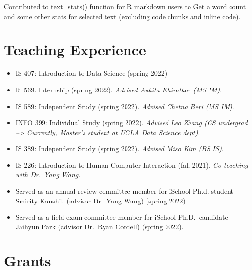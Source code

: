 \documentclass[11pt,a4paper,]{awesome-cv}
\begin{document}
\begin{cventries}
{\begin{cvitems}
\item Contributed to text\_stats() function for R markdown users to Get a word count and some other stats for selected text (excluding code chunks and inline code).
\end{cvitems}}
\end{cventries}

\hypertarget{teaching-experience}{%
\section{Teaching Experience}\label{teaching-experience}}

\begin{itemize}
\item
  IS 407: Introduction to Data Science (spring 2022).
\item
  IS 569: Internship (spring 2022). \emph{Advised Ankita Khiratkar (MS
  IM)}.
\item
  IS 589: Independent Study (spring 2022). \emph{Advised Chetna Beri (MS
  IM)}.
\item
  INFO 399: Individual Study (spring 2022). \emph{Advised Leo Zhang (CS
  undergrad --\textgreater{} Currently, Master's student at UCLA Data
  Science dept)}.
\item
  IS 389: Independent Study (spring 2022). \emph{Advised Miso Kim (BS
  IS)}.
\item
  IS 226: Introduction to Human-Computer Interaction (fall 2021).
  \emph{Co-teaching with Dr.~Yang Wang}.
\item
  Served as an annual review committee member for iSchool Ph.d. student
  Smirity Kaushik (advisor Dr.~Yang Wang) (spring 2022).
\item
  Served as a field exam committee member for iSchool Ph.D.~candidate
  Jaihyun Park (advisor Dr.~Ryan Cordell) (spring 2022).
\end{itemize}

\hypertarget{grants}{%
\section{Grants}\label{grants}}
\end{document}
